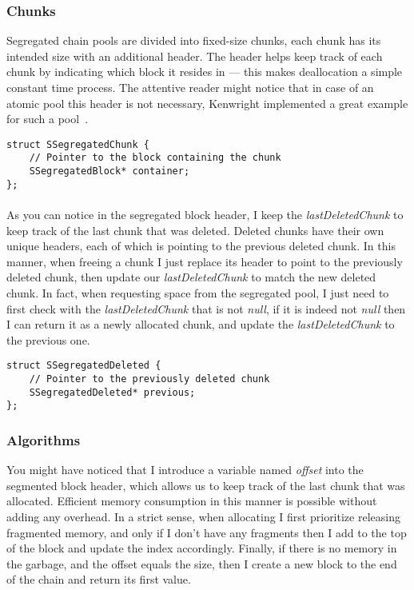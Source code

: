 \documentclass[a4paper, 12pt]{article}
\begin{document}
\subsubsection{Chunks}
Segregated chain pools are divided into fixed-size chunks, each chunk has its intended size with an additional header.
The header helps keep track of each chunk by indicating which block it resides in --- this makes deallocation a simple constant time process.
The attentive reader might notice that in case of an atomic pool this header is not necessary, Kenwright implemented a great example for such a pool~\cite{Kenwright2012FastEF}.
\begin{verbatim}
struct SSegregatedChunk {
    // Pointer to the block containing the chunk
    SSegregatedBlock* container;
};
\end{verbatim}

\paragraph{}
As you can notice in the segregated block header, I keep the \textit{lastDeletedChunk} to keep track of the last chunk that was deleted.
Deleted chunks have their own unique headers, each of which is pointing to the previous deleted chunk.
In this manner, when freeing a chunk I just replace its header to point to the previously deleted chunk, then update our \textit{lastDeletedChunk} to match the new deleted chunk.
In fact, when requesting space from the segregated pool, I just need to first check with the \textit{lastDeletedChunk} that is not \textit{null}, if it is indeed not \textit{null} then I can return it as a newly allocated chunk, and update the \textit{lastDeletedChunk} to the previous one.

\begin{verbatim}
struct SSegregatedDeleted {
    // Pointer to the previously deleted chunk
    SSegregatedDeleted* previous;
};
\end{verbatim}

\subsubsection{Algorithms}
You might have noticed that I introduce a variable named \textit{offset} into the segmented block header, which allows us to keep track of the last chunk that was allocated.
Efficient memory consumption in this manner is possible without adding any overhead.
In a strict sense, when allocating I first prioritize releasing fragmented memory, and only if I don't have any fragments then I add to the top of the block and update the index accordingly.
Finally, if there is no memory in the garbage, and the offset equals the size, then I create a new block to the end of the chain and return its first value.
\end{document}
